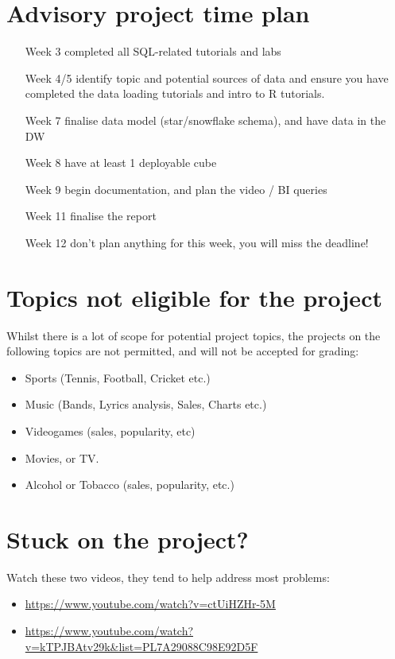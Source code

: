 \documentclass{article}[a4paper,12pt]
\begin{document}
\section{Advisory project time plan}
\begin{itemize}
\item[Week 3] completed all SQL-related tutorials and labs
\item[Week 4/5] identify topic and potential sources of data and ensure you have completed the data loading tutorials and intro to R tutorials.
\item[Week 7] finalise data model (star/snowflake schema), and have data in the DW
\item[Week 8] have at least 1 deployable cube
\item[Week 9] begin documentation, and plan the video / BI queries
\item[Week 11] finalise the report
\item[Week 12] don’t plan anything for this week, you will miss the deadline!
\end{itemize}

\section{Topics not eligible for the project}
Whilst there is a lot of scope for potential project topics, the projects on the following topics are not permitted, and will not be accepted for grading:
\begin{itemize}
\item Sports (Tennis, Football, Cricket etc.)
\item Music (Bands, Lyrics analysis, Sales, Charts etc.)
\item Videogames (sales, popularity, etc)
\item Movies, or TV.
\item Alcohol or Tobacco (sales, popularity, etc.)
\end{itemize}

\section{Stuck on the project?}
Watch these two videos, they tend to help address most problems:
\begin{itemize}
\item \url{https://www.youtube.com/watch?v=ctUiHZHr-5M }
\item \url{https://www.youtube.com/watch?v=kTPJBAtv29k&list=PL7A29088C98E92D5F}
\end{itemize} 
\end{document}
